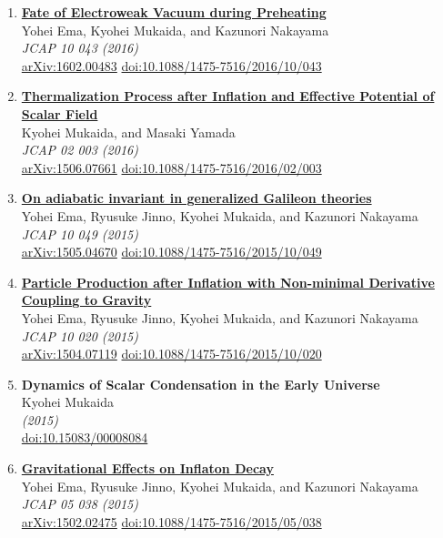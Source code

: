 \begin{enumerate}
\item \textbf{\href{https://arxiv.org/abs/1602.00483}{Fate of Electroweak Vacuum during Preheating}}\\
Yohei Ema, Kyohei Mukaida, and Kazunori Nakayama\\
\emph{JCAP 10 043 (2016)}
\\ \href{https://arxiv.org/abs/1602.00483}{arXiv:1602.00483} \href{https://doi.org/10.1088/1475-7516/2016/10/043}{doi:10.1088/1475-7516/2016/10/043}

\item \textbf{\href{https://arxiv.org/abs/1506.07661}{Thermalization Process after Inflation and Effective Potential of Scalar Field}}\\
Kyohei Mukaida, and Masaki Yamada\\
\emph{JCAP 02 003 (2016)}
\\ \href{https://arxiv.org/abs/1506.07661}{arXiv:1506.07661} \href{https://doi.org/10.1088/1475-7516/2016/02/003}{doi:10.1088/1475-7516/2016/02/003}

\item \textbf{\href{https://arxiv.org/abs/1505.04670}{On adiabatic invariant in generalized Galileon theories}}\\
Yohei Ema, Ryusuke Jinno, Kyohei Mukaida, and Kazunori Nakayama\\
\emph{JCAP 10 049 (2015)}
\\ \href{https://arxiv.org/abs/1505.04670}{arXiv:1505.04670} \href{https://doi.org/10.1088/1475-7516/2015/10/049}{doi:10.1088/1475-7516/2015/10/049}

\item \textbf{\href{https://arxiv.org/abs/1504.07119}{Particle Production after Inflation with Non-minimal Derivative Coupling to Gravity}}\\
Yohei Ema, Ryusuke Jinno, Kyohei Mukaida, and Kazunori Nakayama\\
\emph{JCAP 10 020 (2015)}
\\ \href{https://arxiv.org/abs/1504.07119}{arXiv:1504.07119} \href{https://doi.org/10.1088/1475-7516/2015/10/020}{doi:10.1088/1475-7516/2015/10/020}

\item \textbf{Dynamics of Scalar Condensation in the Early Universe}\\
Kyohei Mukaida\\
\emph{(2015)}
\\ \href{https://doi.org/10.15083/00008084}{doi:10.15083/00008084}

\item \textbf{\href{https://arxiv.org/abs/1502.02475}{Gravitational Effects on Inflaton Decay}}\\
Yohei Ema, Ryusuke Jinno, Kyohei Mukaida, and Kazunori Nakayama\\
\emph{JCAP 05 038 (2015)}
\\ \href{https://arxiv.org/abs/1502.02475}{arXiv:1502.02475} \href{https://doi.org/10.1088/1475-7516/2015/05/038}{doi:10.1088/1475-7516/2015/05/038}


\end{enumerate}
